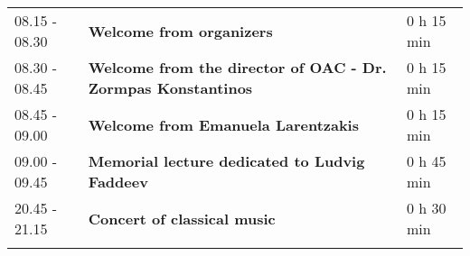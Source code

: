 \begin{longtable}{p{3cm}p{10cm}p{4cm}}
\vspace{1cm}
08.15 - 08.30 & {\bf Welcome from organizers} & \hfill 0 h 15 min\\ 
\vspace{1cm}
08.30 - 08.45 & {\bf Welcome from the director of OAC - Dr. Zormpas Konstantinos} & \hfill 0 h 15 min\\ 
\vspace{1cm}
08.45 - 09.00 & {\bf Welcome from Emanuela Larentzakis} & \hfill 0 h 15 min\\ 
\vspace{1cm}
09.00 - 09.45 & {\bf Memorial lecture dedicated to Ludvig Faddeev} & \hfill 0 h 45 min\\ 
\vspace{1cm}
20.45 - 21.15 & {\bf Concert of classical music} & \hfill 0 h 30 min\\ 
\vspace{1cm}
\end{longtable}

